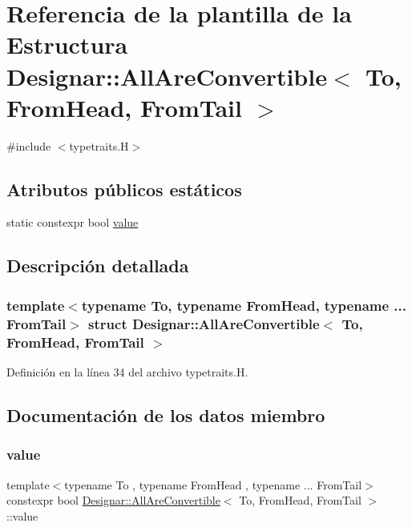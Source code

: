 \hypertarget{struct_designar_1_1_all_are_convertible}{}\section{Referencia de la plantilla de la Estructura Designar\+:\+:All\+Are\+Convertible$<$ To, From\+Head, From\+Tail $>$}
\label{struct_designar_1_1_all_are_convertible}


{\ttfamily \#include $<$typetraits.\+H$>$}

\subsection*{Atributos públicos estáticos}
\begin{DoxyCompactItemize}
\item 
static constexpr bool \hyperlink{struct_designar_1_1_all_are_convertible_a698b71c73875452298bc2e96935240c3}{value}
\end{DoxyCompactItemize}


\subsection{Descripción detallada}
\subsubsection*{template$<$typename To, typename From\+Head, typename ... From\+Tail$>$\newline
struct Designar\+::\+All\+Are\+Convertible$<$ To, From\+Head, From\+Tail $>$}



Definición en la línea 34 del archivo typetraits.\+H.



\subsection{Documentación de los datos miembro}
\mbox{\label{struct_designar_1_1_all_are_convertible_a698b71c73875452298bc2e96935240c3}} 
\subsubsection{\texorpdfstring{value}{value}}
{\footnotesize\ttfamily template$<$typename To , typename From\+Head , typename ... From\+Tail$>$ \\
constexpr bool \hyperlink{struct_designar_1_1_all_are_convertible}{Designar\+::\+All\+Are\+Convertible}$<$ To, From\+Head, From\+Tail $>$\+::value\hspace{0.3cm}{\ttfamily [static]}}

